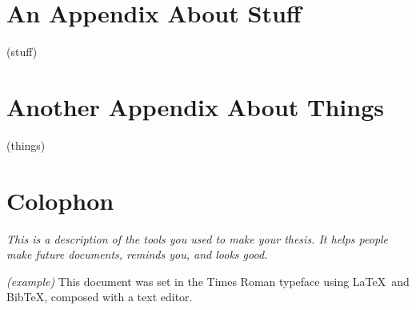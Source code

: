 
\appendix
\chapter{An Appendix About Stuff}
\label{appendixlabel1}
(stuff)

\chapter{Another Appendix About Things}
\label{appendixlabel2}
(things)

\chapter{Colophon}
\label{appendixlabel3}
\textit{This is a description of the tools you used to make your thesis. It helps people make future documents, reminds you, and looks good.}

\textit{(example)} This document was set in the Times Roman typeface using \LaTeX\ and Bib\TeX , composed with a text editor. 

